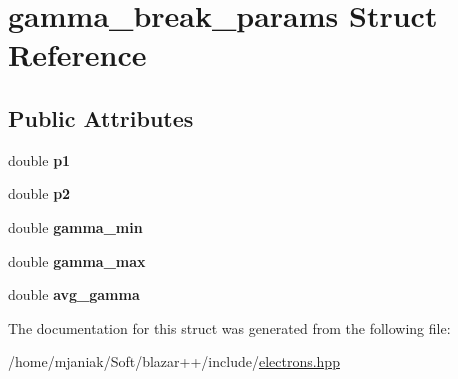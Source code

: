\hypertarget{structgamma__break__params}{\section{gamma\-\_\-break\-\_\-params Struct Reference}
\label{structgamma__break__params}
}
\subsection*{Public Attributes}
\begin{DoxyCompactItemize}
\item 
\hypertarget{structgamma__break__params_ab15a7252bff47351128cde2d58ed9bf3}{double {\bfseries p1}}\label{structgamma__break__params_ab15a7252bff47351128cde2d58ed9bf3}

\item 
\hypertarget{structgamma__break__params_a4b8ccd0d1a10e20083e659cde93a9c2b}{double {\bfseries p2}}\label{structgamma__break__params_a4b8ccd0d1a10e20083e659cde93a9c2b}

\item 
\hypertarget{structgamma__break__params_a3bc9e32ac0e8640107711c06ffd8610c}{double {\bfseries gamma\-\_\-min}}\label{structgamma__break__params_a3bc9e32ac0e8640107711c06ffd8610c}

\item 
\hypertarget{structgamma__break__params_ac22a6a8ec4c755a6418a811d1d90dffb}{double {\bfseries gamma\-\_\-max}}\label{structgamma__break__params_ac22a6a8ec4c755a6418a811d1d90dffb}

\item 
\hypertarget{structgamma__break__params_a1c2c2c67b6a3ae2a370359ca37fd57fc}{double {\bfseries avg\-\_\-gamma}}\label{structgamma__break__params_a1c2c2c67b6a3ae2a370359ca37fd57fc}

\end{DoxyCompactItemize}


The documentation for this struct was generated from the following file\-:\begin{DoxyCompactItemize}
\item 
/home/mjaniak/\-Soft/blazar++/include/\hyperlink{electrons_8hpp}{electrons.\-hpp}\end{DoxyCompactItemize}
